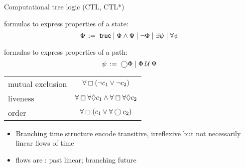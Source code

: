 \documentclass{beamer}
\begin{document}
\begin{slide}{Computational tree logic (CTL, CTL*)}\label{s:45}
\small

  formulas to express  properties of a state:
\[
\Phi\, := \; \mathsf{true} \mid \Phi \wedge \Phi \mid \neg \Phi \mid \exists \psi \mid \forall \psi
\]


 formulas to express properties of a path:
\[
\psi\, := \; \bigcirc \Phi \mid  \Phi \mathbin{\mathcal U} \Psi
\]

\vspace{0.2cm}
\begin{center}
\begin{tabular}{|l|c|}
\hline
mutual exclusion  & $\forall \boxempty (\neg c_1 \vee \neg c_2)$ \\
 liveness & $\forall \boxempty \forall \Diamond c_1 \wedge \forall \boxempty \forall  \Diamond c_2$\\
order  & $\forall \boxempty (c_1 \vee \forall\bigcirc c_2)$\\
\hline
\end{tabular}  
\end{center}

\begin{itemize}
\item Branching time structure encode transitive, irreflexive but not necessarily linear flows of time
\item flows are : past linear; branching future
\end{itemize}
\end{slide}
\end{document}
